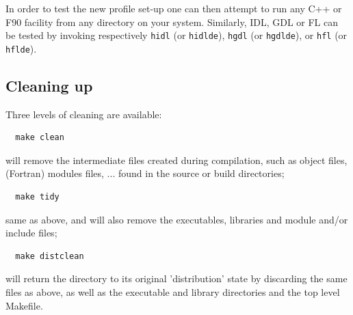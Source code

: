 \documentclass[12pt,twoside]{article}
\begin{document}
\begin{itemize}
%


\end{itemize}

In order to test the new \healpix profile set-up one can then attempt
to run any C++ or F90 facility from any directory on your system. Similarly,
IDL, GDL or FL can be tested by invoking respectively 
\texttt{hidl} (or \texttt{hidlde}),  \texttt{hgdl} (or \texttt{hgdlde}), or \texttt{hfl} (or \texttt{hflde}).



\subsection{Cleaning up}
Three levels of cleaning are available:
\begin{verbatim}
  make clean
\end{verbatim}
will remove the intermediate files created during compilation, such as object
files, (Fortran) modules files, ... found in the source or build directories;
\begin{verbatim}
  make tidy
\end{verbatim}
same as above, and will also remove the \healpix executables, libraries and module and/or
include files;
\begin{verbatim}
  make distclean
\end{verbatim}
will return the \healpix directory to its original 'distribution' state by discarding the same
files as above, as well as the executable and library directories and the top
level Makefile.
\end{document}
